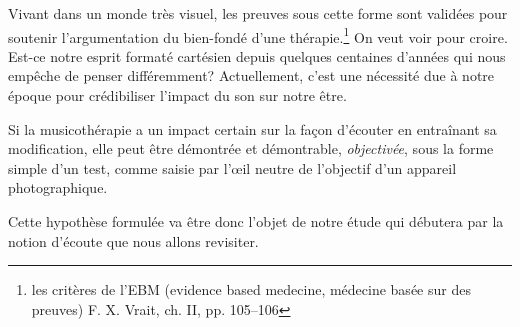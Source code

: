  
Vivant dans un monde très visuel, les preuves sous cette forme sont
validées pour soutenir l'argumentation du bien-fondé d'une thérapie.\footnote{
	les critères de l'EBM (evidence based medecine, médecine basée sur des 
        preuves) F. X. Vrait, ch. II, pp. 105--106 }
On veut voir pour croire. Est-ce 
notre esprit formaté cartésien depuis quelques centaines d'années qui nous 
empêche de penser différemment? 
Actuellement, c'est une nécessité due à notre époque pour crédibiliser l'impact 
du son sur notre être.


Si la 
musicothérapie a un impact certain sur la façon d'écouter en
entraînant sa 
modification, elle peut être  
démontrée et démontrable, \textsl{objectivée},
sous la forme simple d'un test, comme saisie par 
l'\oe il neutre de l'objectif d'un appareil
photographique.

Cette hypothèse formulée va être donc l'objet de notre étude qui
débutera par la notion d'écoute que nous allons revisiter.
